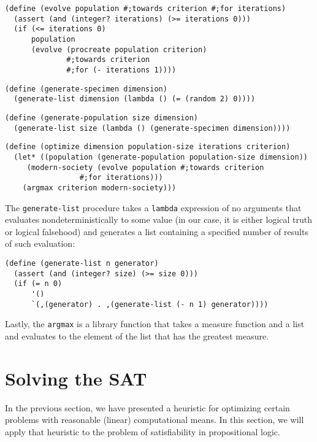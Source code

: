 \begin{Verbatim}[samepage=true]
(define (evolve population #;towards criterion #;for iterations)
  (assert (and (integer? iterations) (>= iterations 0)))
  (if (<= iterations 0)
      population
      (evolve (procreate population criterion)
              #;towards criterion 
              #;for (- iterations 1))))
\end{Verbatim}
\begin{Verbatim}[samepage=true]
(define (generate-specimen dimension)
  (generate-list dimension (lambda () (= (random 2) 0))))
\end{Verbatim}
\begin{Verbatim}[samepage=true]
(define (generate-population size dimension)
  (generate-list size (lambda () (generate-specimen dimension))))
\end{Verbatim}
\begin{Verbatim}[samepage=true]
(define (optimize dimension population-size iterations criterion)
  (let* ((population (generate-population population-size dimension))
	 (modern-society (evolve population #;towards criterion 
				 #;for iterations)))
    (argmax criterion modern-society)))
\end{Verbatim}

The \texttt{generate-list} procedure takes a \texttt{lambda} expression
of no arguments that evaluates nondeterministically to some value
(in our case, it is either logical truth or logical falsehood)
and generates a list containing a specified number of results of
such evaluation:
\begin{Verbatim}[samepage=true]
(define (generate-list n generator)
  (assert (and (integer? size) (>= size 0)))
  (if (= n 0)
      '()
      `(,(generator) . ,(generate-list (- n 1) generator))))
\end{Verbatim}

Lastly, the \texttt{argmax} is a library function that takes
a measure function and a list and evaluates to the element of the
list that has the greatest measure.

\section{Solving the SAT}

In the previous section, we have presented a heuristic
for optimizing certain problems with reasonable (linear)
computational means. In this section, we will apply that
heuristic to the problem of satisfiability in propositional
logic.

